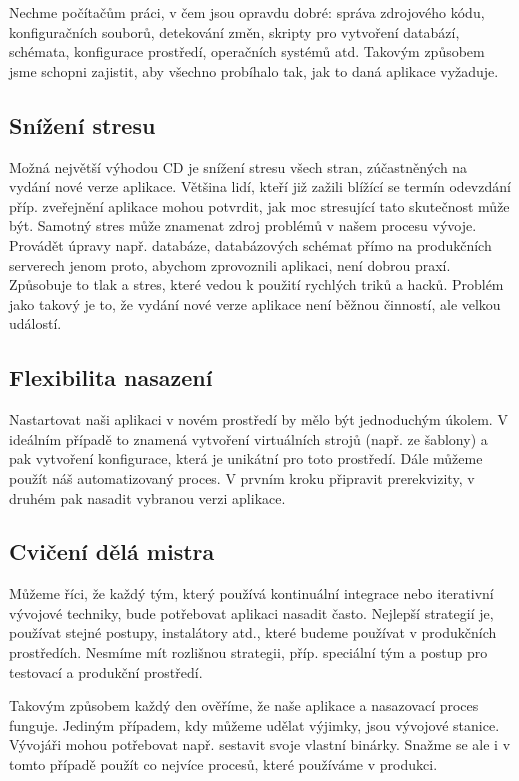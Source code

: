 Nechme počítačům práci, v čem jsou opravdu dobré: správa zdrojového kódu, konfiguračních souborů, detekování změn, skripty pro vytvoření databází, schémata, konfigurace prostředí, operačních systémů atd. Takovým způsobem jsme schopni zajistit, aby všechno probíhalo tak, jak to daná aplikace vyžaduje.

\subsection{Snížení stresu}
Možná největší výhodou CD je snížení stresu všech stran, zúčastněných na vydání nové verze aplikace. Většina lidí, kteří již zažili blížící se termín odevzdání příp. zveřejnění aplikace mohou potvrdit, jak moc stresující tato skutečnost může být. Samotný stres může znamenat zdroj problémů v našem procesu vývoje. Provádět úpravy např. databáze, databázových schémat přímo na produkčních serverech jenom proto, abychom zprovoznili aplikaci, není dobrou praxí. 
Způsobuje to tlak a stres, které vedou k použití rychlých triků a hacků. Problém jako takový je to, že vydání nové verze aplikace není běžnou činností, ale velkou událostí.

\subsection{Flexibilita nasazení}
Nastartovat naši aplikaci v novém prostředí by mělo být jednoduchým úkolem. V ideálním případě to znamená vytvoření virtuálních strojů (např. ze šablony) a pak vytvoření konfigurace, která je unikátní pro toto prostředí. Dále můžeme použít náš automatizovaný proces. V prvním kroku připravit prerekvizity, v druhém pak nasadit vybranou verzi aplikace.

\subsection{Cvičení dělá mistra}
Můžeme říci, že každý tým, který používá kontinuální integrace nebo iterativní vývojové techniky, bude potřebovat aplikaci nasadit často. Nejlepší strategií je, používat stejné postupy, instalátory atd., které budeme používat v produkčních prostředích. Nesmíme mít rozlišnou strategii, příp. speciální tým a postup pro testovací a produkční prostředí. 

Takovým způsobem každý den ověříme, že naše aplikace a nasazovací proces funguje. Jediným případem, kdy můžeme udělat výjimky, jsou vývojové stanice. Vývojáři mohou potřebovat např. sestavit svoje vlastní binárky. Snažme se ale i v tomto případě použít co nejvíce procesů, které používáme v produkci.

